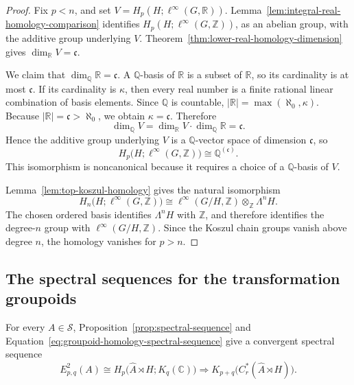 \documentclass[pdflatex,sn-mathphys-num]{sn-jnl}%
\theoremstyle{plain}
\theoremstyle{remark}
\theoremstyle{definition}
\numberwithin{equation}{section}
\begin{document}
\begin{proof}
Fix \( p<n \), and set \( V=H_p(H;\ell^\infty(G,\mathbb R)) \). Lemma~\ref{lem:integral-real-homology-comparison} identifies \( H_p(H;\ell^\infty(G,\mathbb Z)) \), as an abelian group, with the additive group underlying \( V \). Theorem~\ref{thm:lower-real-homology-dimension} gives \( \dim_{\mathbb R}V=\mathfrak c \).

We claim that \( \dim_{\mathbb Q}\mathbb R=\mathfrak c \). A \( \mathbb Q \)-basis of \( \mathbb R \) is a subset of \( \mathbb R \), so its cardinality is at most \( \mathfrak c \). If its cardinality is \( \kappa \), then every real number is a finite rational linear combination of basis elements. Since \( \mathbb Q \) is countable, \( |\mathbb R| = \max(\aleph_0,\kappa) \). Because \( |\mathbb R|=\mathfrak c>\aleph_0 \), we obtain \( \kappa=\mathfrak c \). Therefore
\[
\dim_{\mathbb Q}V
=
\dim_{\mathbb R}V
\cdot
\dim_{\mathbb Q}\mathbb R
=
\mathfrak c.
\]
Hence the additive group underlying \( V \) is a \( \mathbb Q \)-vector space of dimension \( \mathfrak c \), so
\[
H_p\bigl(H;\ell^\infty(G,\mathbb Z)\bigr)
\cong
\mathbb Q^{(\mathfrak c)}.
\]
This isomorphism is noncanonical because it requires a choice of a \( \mathbb Q \)-basis of \( V \).

Lemma~\ref{lem:top-koszul-homology} gives the natural isomorphism
\[
H_n\bigl(H;\ell^\infty(G,\mathbb Z)\bigr)
\cong
\ell^\infty(G/H,\mathbb Z)
\otimes_{\mathbb Z}
\Lambda^nH.
\]
The chosen ordered basis identifies \( \Lambda^nH \) with \( \mathbb Z \), and therefore identifies the degree-\( n \) group with \( \ell^\infty(G/H,\mathbb Z) \). Since the Koszul chain groups vanish above degree \( n \), the homology vanishes for \( p>n \).
\end{proof}

\subsection{The spectral sequences for the transformation groupoids}

For every \( A\in\mathcal S \), Proposition~\ref{prop:spectral-sequence} and Equation~\eqref{eq:groupoid-homology-spectral-sequence} give a convergent spectral sequence
\begin{equation}
\label{eq:stage-spectral-sequence}
E^2_{p,q}(A)
\cong
H_p\bigl(\widehat A\rtimes H;K_q(\mathbb C)\bigr)
\Longrightarrow
K_{p+q}\bigl(C_r^*(\widehat A\rtimes H)\bigr).
\end{equation}
\end{document}
